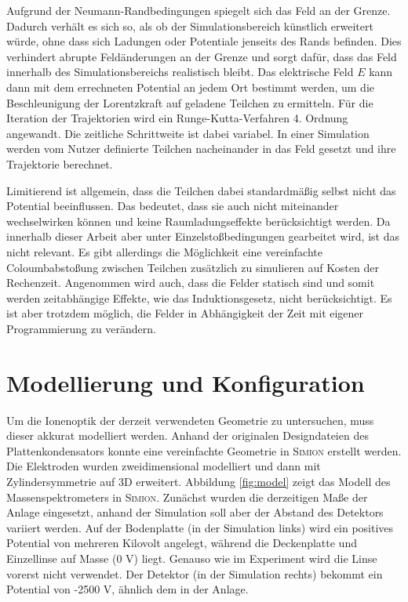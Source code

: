 Aufgrund der Neumann-Randbedingungen spiegelt sich das Feld an der Grenze. Dadurch verhält es sich so, als ob der Simulationsbereich künstlich erweitert würde, ohne dass sich Ladungen oder Potentiale jenseits des Rands befinden. Dies verhindert abrupte Feldänderungen an der Grenze und sorgt dafür, dass das Feld innerhalb des Simulationsbereichs realistisch bleibt. Das elektrische Feld $E$ kann dann mit dem errechneten Potential an jedem Ort bestimmt werden, um die Beschleunigung der Lorentzkraft auf geladene Teilchen zu ermitteln. Für die Iteration der Trajektorien wird ein Runge-Kutta-Verfahren 4. Ordnung angewandt. Die zeitliche Schrittweite ist dabei variabel. In einer Simulation werden vom Nutzer definierte Teilchen nacheinander in das Feld gesetzt und ihre Trajektorie berechnet. 

Limitierend ist allgemein, dass die Teilchen dabei standardmäßig selbst nicht das Potential beeinflussen. Das bedeutet, dass sie auch nicht miteinander wechselwirken können und keine Raumladungseffekte berücksichtigt werden. Da innerhalb dieser Arbeit aber unter Einzelstoßbedingungen gearbeitet wird, ist das nicht relevant. Es gibt allerdings die Möglichkeit eine vereinfachte Coloumbabstoßung zwischen Teilchen zusätzlich zu simulieren auf Kosten der Rechenzeit. Angenommen wird auch, dass die Felder statisch sind und somit werden zeitabhängige Effekte, wie das Induktionsgesetz, nicht berücksichtigt. Es ist aber trotzdem möglich, die Felder in Abhängigkeit der Zeit mit eigener Programmierung zu verändern.

\section{Modellierung und Konfiguration}
Um die Ionenoptik der derzeit verwendeten Geometrie zu untersuchen, muss dieser akkurat modelliert werden. Anhand der originalen Designdateien des Plattenkondensators konnte eine vereinfachte Geometrie in \textsc{Simion} erstellt werden. Die Elektroden wurden zweidimensional modelliert und dann mit Zylindersymmetrie auf 3D erweitert. Abbildung \ref{fig:model} zeigt das Modell des Massenspektrometers in \textsc{Simion}. Zunächst wurden die derzeitigen Maße der Anlage eingesetzt, anhand der Simulation soll aber der Abstand des Detektors variiert werden. Auf der Bodenplatte (in der Simulation links) wird ein positives Potential von mehreren Kilovolt angelegt, während die Deckenplatte und Einzellinse auf Masse (0 V) liegt. Genauso wie im Experiment wird die Linse vorerst nicht verwendet. Der Detektor (in der Simulation rechts) bekommt ein Potential von -2500 V, ähnlich dem in der Anlage. 

